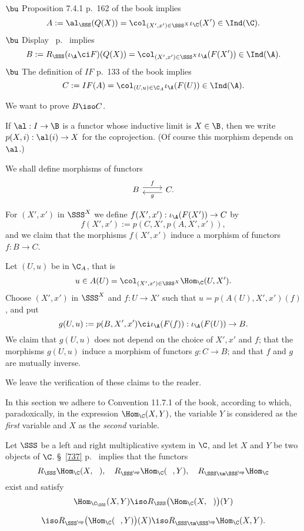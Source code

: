 \documentclass[12pt]{article}
\theoremstyle{remark}
\theoremstyle{definition}
\begin{document}
\nn$\bu$ Proposition 7.4.1 p.~162 of the book implies
$$
A:=\al_\SSS(Q(X))=\col_{(X',x')\in\SSS^X}\iota_\C(X')\in\Ind(\C).
$$ 
$\bu$ Display~ p.~ implies
$$
B:=R_\SSS(\iota_\A\ci F)(Q(X))=\col_{(X',x')\in\SSS^X}\iota_\A(F(X'))\in\Ind(\A).
$$
$\bu$ The definition of $IF$ p.~133 of the book implies
$$
C:=IF(A)=\col_{(U,u)\in\C_A}\iota_\A(F(U))\in\Ind(\A).
$$

We want to prove $B\iso C$.

 If $\al:I\to\B$ is a functor whose inductive limit is $X\in\B$, then we write $p(X,i):\al(i)\to X$ for the coprojection. (Of course this morphism depends on $\al$.) 

We shall define morphisms of functors 
$$
\begin{tikzcd}
B\ar[yshift=.7ex]{r}{f}&C\ar[yshift=-.7ex]{l}{g}.
\end{tikzcd}
$$

For $(X',x')$ in $\SSS^X$ we define $f(X',x'):\iota_\A(F(X'))\to C$ by 
$$
f(X',x'):=p(C,X',p(A,X',x')),
$$ 
and we claim that the morphisms $f(X',x')$ induce a morphism of functors $f:B\to C$. 

Let $(U,u)$ be in $\C_A$, that is
$$
u\in A(U)=\col_{(X',x')\in\SSS^X}\Hom_\C(U,X').
$$ 
Choose $(X',x')$ in $\SSS^X$ and $f:U\to X'$ such that $u=p(A(U),X',x')(f)$, and put 
$$
g(U,u):=p(B,X',x')\ci\iota_\A(F(f)):\iota_\A(F(U))\to B.
$$ 
We claim that $g(U,u)$ does not depend on the choice of $X',x'$ and $f$; that the morphisms $g(U,u)$ induce a morphism of functors $g:C\to B$; and that $f$ and $g$ are mutually inverse. 

We leave the verification of these claims to the reader. 



In this section we adhere to Convention 11.7.1 of the book, according to which, paradoxically, in the expression $\Hom_\C(X,Y)$, the variable $Y$ is considered as the \emph{first} variable and $X$ as the \emph{second} variable.

Let $\SSS$ be a left and right multiplicative system in $\C$, and let $X$ and $Y$ be two objects of $\C$. \S~\ref{737} p.~ implies that the functors 
$$
R_\SSS\Hom_\C(X,\ \ ),\quad R_{\SSS^{\op}}\Hom_\C(\ \ ,Y),\quad R_{\SSS\tm\SSS^{\op}}\Hom_\C
$$
exist and satisfy 
$$
\Hom_{\C_\SSS}(X,Y)\iso R_\SSS\big(\Hom_\C(X,\ \ )\big)(Y)
$$

$$
\iso R_{\SSS^{\op}}\big(\Hom_\C(\ \ ,Y)\big)(X)\iso R_{\SSS\tm\SSS^{\op}}\Hom_\C(X,Y).
$$
\end{document}
